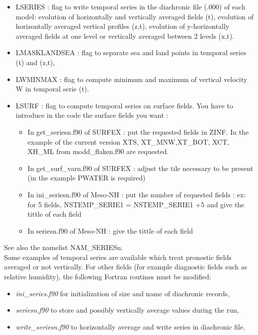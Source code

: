 \begin{itemize}
\item LSERIES :
 flag to write temporal series in the diachronic file (.000) of each model:
evolution of horizontally and vertically averaged fields (t), 
evolution of horizontally averaged vertical profiles (z,t), 
evolution of y-horizontally averaged fields at one level or vertically averaged between 2 levels (x,t). 
\item LMASKLANDSEA :
 flag to separate sea and land points in temporal series (t) and (z,t),
\item LWMINMAX :
 flag to compute minimum and maximum of vertical velocity W in temporal serie
(t).
\item LSURF : flag to compute temporal series on surface fields.
You have to introduce in the code the surface fields you want  : 
\begin{itemize}
\item In  get\_seriesn.f90 of SURFEX : put the requested fields in ZINF. In the example of the current version XTS, XT\_MNW,XT\_BOT, XCT, XH\_ML from modd\_flaken.f90 are requested.
\item In get\_surf\_varn.f90 of SURFEX : adjust the tile necessary to be present (in the example PWATER is required)
\item In ini\_seriesn.f90 of Meso-NH : put the number of requested fields  : ex: for 5 fields, NSTEMP\_SERIE1 = NSTEMP\_SERIE1 +5 and give the tittle of each field
\item In seriesn.f90 of Meso-NH : give the tittle of each field
\end{itemize}
\end{itemize}
See also the namelist NAM\_SERIESn. \\

Some examples of temporal series are available which treat pronostic fields 
averaged or not vertically. For other fields (for example diagnostic
fields such as relative humidity), the following Fortran
routines must be modified:
\begin{itemize}
\item  {\it ini\_series.f90} for initialization of size and name of diachronic
records,
\item  {\it seriesn.f90} to store and possibly vertically average values 
during the run,
\item  {\it write\_seriesn.f90} to horizontally average and write series in
diachronic file.
\end{itemize}
